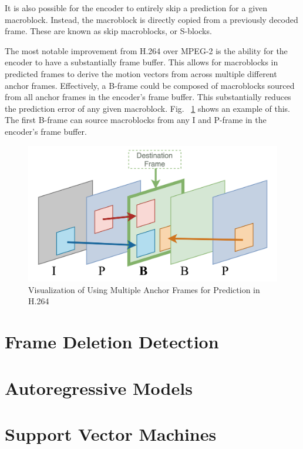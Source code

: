 It is also possible for the encoder to entirely skip a prediction for a given macroblock. Instead, the macroblock is directly copied from a previously decoded frame. These are known as skip macroblocks, or S-blocks.

The most notable improvement from H.264 over MPEG-2 is the ability for the encoder to have a substantially frame buffer. This allows for macroblocks in predicted frames to derive the motion vectors from across multiple different anchor frames. Effectively, a B-frame could be composed of macroblocks sourced from all anchor frames in the encoder's frame buffer. This substantially reduces the prediction error of any given macroblock. Fig. ~\ref{multipred} shows an example of this. The first B-frame can source macroblocks from any I and P-frame in the encoder's frame buffer.

\begin{figure}[htbp]
\centerline{\includegraphics[width=0.9\linewidth]{Background/multi_frame_pred.png}}
\caption{Visualization of Using Multiple Anchor Frames for Prediction in H.264}
\label{multipred}
\end{figure}

\section{Frame Deletion Detection}

\section{Autoregressive Models}

\section{Support Vector Machines}